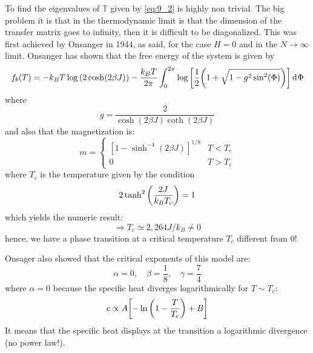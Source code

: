 \documentclass[../main/main.tex]{subfiles}
\begin{document}

To find the eigenvalues of \( \mathbb{T} \) given by  \eqref{eq:9_2} is highly non trivial. The big problem it is that in the thermodynamic limit is that the dimension of the transfer matrix goes to infinity, then it is difficult to be diagonalized. This was first achieved by Onsanger in 1944, as said, for the case \( H=0 \) and in the \( N \rightarrow \infty  \) limit. Onsanger has shown that the free energy of the system is given by
\begin{equation}
  f_b (T) = -k_B T \log{\qty(2 \cosh(2 \beta J))- \frac{k_B T}{2 \pi} \int_{0}^{2\pi} \log{\qty[\frac{1}{2}\qty(1+ \sqrt{1-g^2 \sin^2(\Phi) } )] } \dd[]{\Phi }  }
\end{equation}
 where
\begin{equation*}
  g = \frac{2}{\cosh(2 \beta J)\coth(2 \beta J)}
\end{equation*}
and also that the magnetization is:
\begin{equation}
 m= \begin{cases}
 \left[1-\sinh ^{-4}(2\beta J)\right]^{1/8}&T<T_{c}\\
 0&T>T_{c}
 \end{cases}    
\end{equation}
where \(T_c\) is the temperature given by the condition
\begin{equation*}
  2 \tanh^2 \qty(\frac{2J}{k_B T_c}) = 1 
\end{equation*}
 which yields the numeric result:
 \begin{equation*} \Rightarrow T_c \simeq 2,264 J/k_B \neq 0
\end{equation*}
hence, we have a phase transition at a critical temperature \(T_c\) different from 0!

Onsager also showed that the critical exponents of this model are:
\begin{equation*}
\alpha =0,\quad \beta=\frac{1}{8}, \quad \gamma = \frac{7}{4}
\end{equation*}
where \(\alpha=0\)  because the specific heat diverges logarithmically for \(T \sim T_c\):
\begin{equation*}
  c \propto A \qty[-\ln{\qty(1- \frac{T}{T_c}) } + B  ]
\end{equation*}
It means that the specific heat displays at the transition a logarithmic divergence (no power law!).
\end{document}

